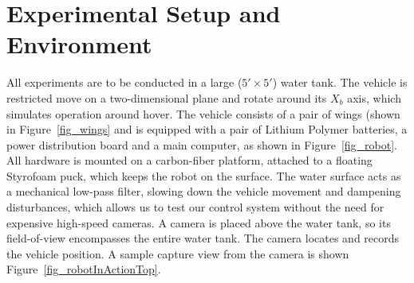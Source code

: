 \section{Experimental Setup and Environment}
\label{sec-environment}

All experiments are to be conducted in a large ($5' \times 5'$) water tank. The vehicle is restricted move on a two-dimensional plane and rotate around its $X_b$ axis, which simulates operation around hover. The vehicle consists of a pair of wings (shown in Figure~\ref{fig_wings} and is equipped with a pair of Lithium Polymer batteries, a power distribution board and a main computer, as shown in Figure~\ref{fig_robot}. All hardware is mounted on a carbon-fiber platform, attached to a floating Styrofoam puck, which keeps the robot on the surface. The water surface acts as a mechanical low-pass filter, slowing down the vehicle movement and dampening disturbances, which allows us to test our control system without the need for expensive high-speed cameras. A camera is placed above the water tank, so its field-of-view encompasses the entire water tank. The camera locates and records the vehicle position. A sample capture view from the camera is shown Figure~\ref{fig_robotInActionTop}.

